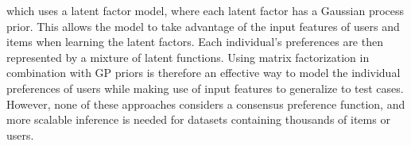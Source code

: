 which uses a latent factor model, where each latent factor has a Gaussian process prior. 
This allows the model to take advantage of the input features of
users and items when learning the latent factors. 
Each individual's preferences are then represented 
by a mixture of latent functions.
Using matrix factorization in combination with GP priors is therefore an effective
way to model the individual preferences of users while
making use of input features to generalize to test cases. However,
none of these approaches considers a consensus preference function, and
more scalable inference is needed for datasets containing thousands of items or users.



